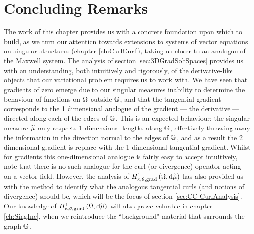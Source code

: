 \section{Concluding Remarks} \label{sec:Scalar-Conc}
The work of this chapter provides us with a concrete foundation upon which to build, as we turn our attention towards extensions to systems of vector equations on singular structures (chapter \ref{ch:CurlCurl}), taking us closer to an analogue of the Maxwell system.
The analysis of section \ref{sec:3DGradSobSpaces} provides us with an understanding, both intuitively and rigorously, of the derivative-like objects that our variational problem requires us to work with.
We have seen that gradients of zero emerge due to our singular measures inability to determine the behaviour of functions on $\Omega$ outside $\mathbb{G}$, and that the tangential gradient corresponds to the 1 dimensional analogue of the gradient --- the derivative --- directed along each of the edges of $\mathbb{G}$.
This is an expected behaviour; the singular measure $\widetilde{\mu}$ only respects 1 dimensional lengths along $\mathbb{G}$, effectively throwing away the information in the direction normal to the edges of $\mathbb{G}$, and as a result the 2 dimensional gradient is replace with the 1 dimensional tangential gradient.
Whilst for gradients this one-dimensional analogue is fairly easy to accept intuitively, note that there is no such analogue for the curl (or divergence) operator acting on a vector field.
However, the analysis of $H^1_{\kappa,\theta,\mathrm{grad}}\left( \Omega, \mathrm{d}\widetilde{\mu} \right)$ has also provided us with the method to identify what the analogous tangential curls (and notions of divergence) should be, which will be the focus of section \ref{sec:CC-CurlAnalysis}.
Our knowledge of $H^1_{\kappa,\theta,\mathrm{grad}}\left( \Omega, \mathrm{d}\widetilde{\mu} \right)$ will also prove valuable in chapter \ref{ch:SingInc}, when we reintroduce the ``background" material that surrounds the graph $\mathbb{G}$.

